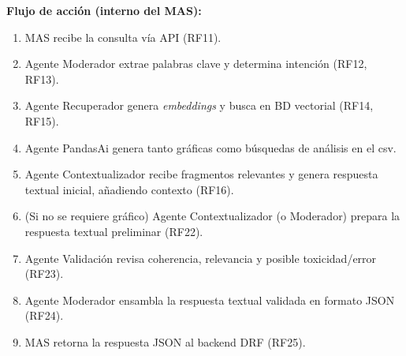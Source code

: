\begin{userstory}[hu:09]
{		\textbf{Flujo de acción (interno del MAS):}
		\begin{enumerate}
			\item MAS recibe la consulta vía API (RF11).
			\item Agente Moderador extrae palabras clave y determina intención (RF12, RF13).
			\item Agente Recuperador genera \textit{embeddings} y busca en BD vectorial (RF14, RF15).
			\item Agente PandasAi genera tanto gráficas como búsquedas de análisis en el csv.
			\item Agente Contextualizador recibe fragmentos relevantes y genera respuesta textual inicial, añadiendo contexto (RF16).
			\item (Si no se requiere gráfico) Agente Contextualizador (o Moderador) prepara la respuesta textual preliminar (RF22).
			\item Agente Validación revisa coherencia, relevancia y posible toxicidad/error (RF23).
			\item Agente Moderador ensambla la respuesta textual validada en formato JSON (RF24).
			\item MAS retorna la respuesta JSON al backend DRF (RF25).
		\end{enumerate}
	}
	
\end{userstory}

